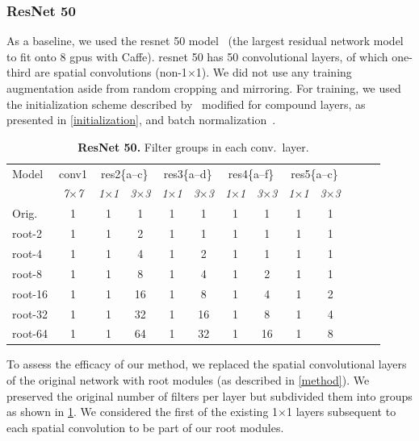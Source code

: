 \documentclass[thesis]{subfiles}
\begin{document}
	\subsubsection{ResNet 50}
	\label{resnet50results}
	As a baseline, we used the \gls{resnet} 50 model~\citep{He2015} (the largest residual network model to fit onto 8 \gls{gpu}s with Caffe). \gls{resnet} 50 has 50 convolutional layers, of which one-third are spatial convolutions (non-1$\times$1). We did not use any training augmentation aside from random cropping and mirroring. 
	For training, we used the initialization scheme described by~\citep{He2015b} modified for compound layers, as presented in \cref{initialization}, and batch normalization~\citep{Ioffe2015}.
	\begin{table}[tp]
		\caption[ResNet 50 root architectures]{\textbf{ResNet 50.} Filter groups in each conv.\ layer.}
		\label{table:resnet50config}
		\centering
		\begin{tabular}{@{}lcccccccccccc@{}}
			\toprule
			Model & conv1 & \multicolumn{2}{c}{res2\{a--c\}} & \multicolumn{2}{c}{res3\{a--d\}} & \multicolumn{2}{c}{res4\{a--f\}} & \multicolumn{2}{c}{res5\{a--c\}} \\
			& \textit{\footnotesize7$\times$7} & \textit{\footnotesize1$\times$1} & \textit{\footnotesize3$\times$3} & \textit{\footnotesize1$\times$1} & \textit{\footnotesize3$\times$3} & \textit{\footnotesize1$\times$1} & \textit{\footnotesize3$\times$3} & \textit{\footnotesize1$\times$1} & \textit{\footnotesize3$\times$3} \\
			Orig. & 1 & 1 & 1 & 1 &  1 & 1 &  1 & 1 & 1 \\
			\midrule
			root-2 & 1 & 1 & 2 & 1 &  1 & 1 &  1 & 1 & 1 \\
			root-4 & 1 & 1 & 4 & 1 &  2 & 1 &  1 & 1 & 1 \\
			root-8 & 1 & 1 & 8 & 1 &  4 & 1 &  2 & 1 & 1 \\
			root-16 & 1 & 1 & 16 & 1 &  8 & 1 &  4 & 1 & 2 \\
			root-32 & 1 & 1 & 32 & 1 & 16 & 1 &  8 & 1 & 4 \\
			root-64 & 1 & 1 & 64 & 1 & 32 & 1 & 16 & 1 & 8 \\
			\bottomrule
		\end{tabular}
	\end{table}
	To assess the efficacy of our method, we replaced the spatial convolutional layers of the original network with root modules (as described in \cref{method}). We preserved the original number of filters per layer but subdivided them into groups as shown in \cref{table:resnet50config}. We considered the first of the existing 1$\times$1 layers subsequent to each spatial convolution to be part of our root modules. 
\end{document}
